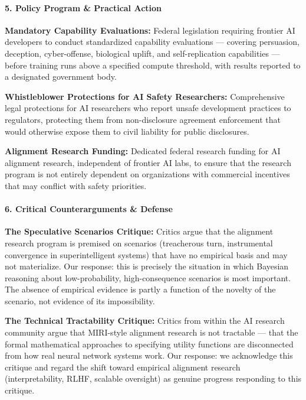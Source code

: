\paragraph{5. Policy Program \& Practical
Action}\label{policy-program-practical-action-3}

\textbf{Mandatory Capability Evaluations:} Federal legislation requiring
frontier AI developers to conduct standardized capability evaluations
--- covering persuasion, deception, cyber-offense, biological uplift,
and self-replication capabilities --- before training runs above a
specified compute threshold, with results reported to a designated
government body.

\textbf{Whistleblower Protections for AI Safety Researchers:}
Comprehensive legal protections for AI researchers who report unsafe
development practices to regulators, protecting them from non-disclosure
agreement enforcement that would otherwise expose them to civil
liability for public disclosures.

\textbf{Alignment Research Funding:} Dedicated federal research funding
for AI alignment research, independent of frontier AI labs, to ensure
that the research program is not entirely dependent on organizations
with commercial incentives that may conflict with safety priorities.

\paragraph{6. Critical Counterarguments \&
Defense}\label{critical-counterarguments-defense-3}

\textbf{The Speculative Scenarios Critique:} Critics argue that the
alignment research program is premised on scenarios (treacherous turn,
instrumental convergence in superintelligent systems) that have no
empirical basis and may not materialize. Our response: this is precisely
the situation in which Bayesian reasoning about low-probability,
high-consequence scenarios is most important. The absence of empirical
evidence is partly a function of the novelty of the scenario, not
evidence of its impossibility.

\textbf{The Technical Tractability Critique:} Critics from within the AI
research community argue that MIRI-style alignment research is not
tractable --- that the formal mathematical approaches to specifying
utility functions are disconnected from how real neural network systems
work. Our response: we acknowledge this critique and regard the shift
toward empirical alignment research (interpretability, RLHF, scalable
oversight) as genuine progress responding to this critique.

